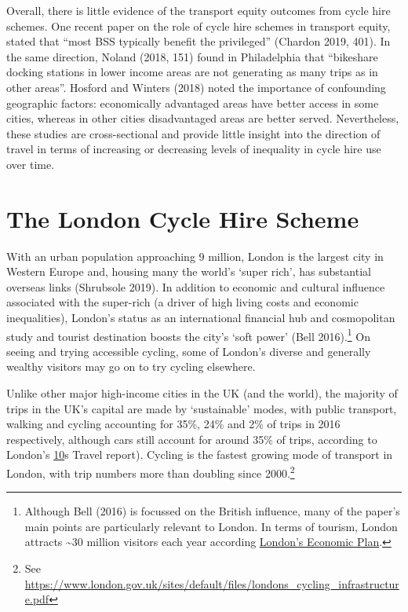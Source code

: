 \documentclass[
]{article}
\begin{document}
Overall, there is little evidence of the transport equity outcomes from cycle hire schemes.
One recent paper on the role of cycle hire schemes in transport equity, stated that ``most BSS typically benefit the privileged'' (Chardon 2019, 401).
In the same direction, Noland (2018, 151) found in Philadelphia that ``bikeshare docking stations in lower income areas are not generating as many trips as in other areas''.
Hosford and Winters (2018) noted the importance of confounding geographic factors: economically advantaged areas have better access in some cities, whereas in other cities disadvantaged areas are better served.
Nevertheless, these studies are cross-sectional and provide little insight into the direction of travel in terms of increasing or decreasing levels of inequality in cycle hire use over time.

\hypertarget{the-london-cycle-hire-scheme}{%
\section{The London Cycle Hire Scheme}\label{the-london-cycle-hire-scheme}}

With an urban population approaching 9 million, London is the largest city in Western Europe and, housing many the world's `super rich', has substantial overseas links (Shrubsole 2019).
In addition to economic and cultural influence associated with the super-rich (a driver of high living costs and economic inequalities), London's status as an international financial hub and cosmopolitan study and tourist destination boosts the city's `soft power' (Bell 2016).\footnote{
  Although Bell (2016) is focussed on the British influence, many of the paper's main points are particularly relevant to London.
  In terms of tourism, London attracts \textasciitilde30 million visitors each year according \href{http://www.uncsbrp.org/tourism.htm}{London's Economic Plan}.}
On seeing and trying accessible cycling, some of London's diverse and generally wealthy visitors may go on to try cycling elsewhere.

Unlike other major high-income cities in the UK (and the world), the majority of trips in the UK's capital are made by `sustainable' modes, with public transport, walking and cycling accounting for 35\%, 24\% and 2\% of trips in 2016 respectively, although cars still account for around 35\% of trips, according to London's \href{https://www.google.com/url?sa=t\&rct=j\&q=\&esrc=s\&source=web\&cd=5\&ved=2ahUKEwjj6b6pldXlAhV5ShUIHRQZBYQQFjAEegQIAhAC\&url=https\%3A\%2F\%2Ftfl.gov.uk\%2Fcdn\%2Fstatic\%2Fcms\%2Fdocuments\%2Ftravel-in-london-report-10-data.xlsx\&usg=AOvVaw3wFwZPyKmV86i71fCoa0Bo}{10}s Travel report).
Cycling is the fastest growing mode of transport in London, with trip numbers more than doubling since 2000.\footnote{
  See \url{https://www.london.gov.uk/sites/default/files/londons_cycling_infrastructure.pdf}}
\end{document}
